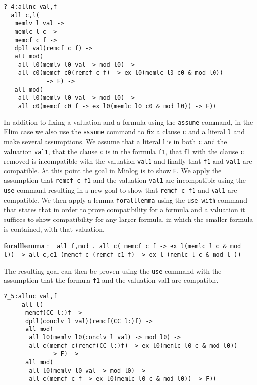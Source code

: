 \begin{lstlisting}[caption = "The Elim Case in Minlog"]
?_4:allnc val,f
  all c,l(
   memlv l val ->
   memlc l c ->
   memcf c f ->
   dpll val(remcf c f) ->
   all mod(
    all l0(memlv l0 val -> mod l0) ->
    all c0(memcf c0(remcf c f) -> ex l0(memlc l0 c0 & mod l0)) 
            -> F) ->
   all mod(
    all l0(memlv l0 val -> mod l0) ->
    all c0(memcf c0 f -> ex l0(memlc l0 c0 & mod l0)) -> F))
\end{lstlisting}
In addition to fixing a valuation and a formula using the \texttt{assume} command, in the Elim case we also use the \texttt{assume} command to fix a clause \texttt{c} and a literal \texttt{l} and make several assumptions. We assume that a literal l is in both \texttt{c} and the valuation \texttt{val1}, that the clause \texttt{c} is in the formula \texttt{f1}, that f1 with the clause \texttt{c} removed is incompatible with the valuation \texttt{val1} and finally that \texttt{f1} and \texttt{val1} are compatible. At this point the goal in Minlog is to show \texttt{F}. We apply the assumption that \texttt{remcf c f1} and the valuation \texttt{val1} are incompatible using the \texttt{use} command resulting in a new goal to show that \texttt{remcf c f1} and \texttt{val1} are compatible. We then apply a lemma \texttt{foralllemma} using the \texttt{use-with} command that states that in order to prove compatibility for a formula and a valuation it suffices to show compatibility for any larger formula, in which the smaller formula is contained, with that valuation.

\begin{center}
\textbf{foralllemma} := \texttt{all f,mod . all c( memcf c f -> ex l(memlc l c \& mod l)) -> all c,c1 (memcf c (remcf c1 f) -> ex l (memlc l c \&  mod l ))} \\
\end{center}

The resulting goal can then be proven using the \texttt{use} command with the assumption that the formula \texttt{f1} and the valuation {val1} are compatible.


\begin{lstlisting}[caption = "The Unit Case in Minlog"]
?_5:allnc val,f
     all l(
      memcf(CC l:)f ->
      dpll(conclv l val)(remcf(CC l:)f) ->
      all mod(
       all l0(memlv l0(conclv l val) -> mod l0) ->
       all c(memcf c(remcf(CC l:)f) -> ex l0(memlc l0 c & mod l0)) 
             -> F) ->
      all mod(
       all l0(memlv l0 val -> mod l0) ->
       all c(memcf c f -> ex l0(memlc l0 c & mod l0)) -> F))
\end{lstlisting}

